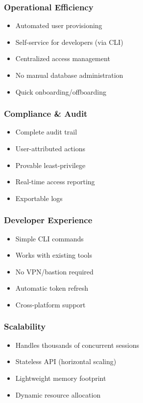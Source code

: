 \subsubsection{Operational Efficiency}
\begin{itemize}
    \item Automated user provisioning
    \item Self-service for developers (via CLI)
    \item Centralized access management
    \item No manual database administration
    \item Quick onboarding/offboarding
\end{itemize}

\subsubsection{Compliance \& Audit}
\begin{itemize}
    \item Complete audit trail
    \item User-attributed actions
    \item Provable least-privilege
    \item Real-time access reporting
    \item Exportable logs
\end{itemize}

\subsubsection{Developer Experience}
\begin{itemize}
    \item Simple CLI commands
    \item Works with existing tools
    \item No VPN/bastion required
    \item Automatic token refresh
    \item Cross-platform support
\end{itemize}

\subsubsection{Scalability}
\begin{itemize}
    \item Handles thousands of concurrent sessions
    \item Stateless API (horizontal scaling)
    \item Lightweight memory footprint
    \item Dynamic resource allocation
\end{itemize}

